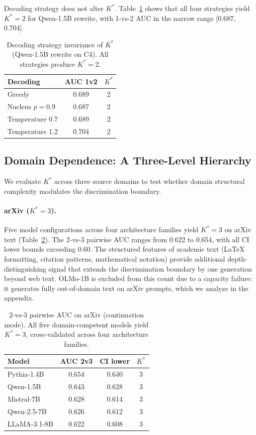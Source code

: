 \documentclass[11pt,a4paper]{article}
\newcommand{\Kstar}{K^{*}}
\begin{document}
Decoding strategy does not alter $\Kstar$. Table~\ref{tab:decoding} shows that all four strategies yield $\Kstar = 2$ for Qwen-1.5B rewrite, with 1-vs-2 AUC in the narrow range [0.687, 0.704].

\begin{table}[t]
\centering
\small
\begin{tabular}{lcc}
\toprule
\textbf{Decoding} & \textbf{AUC 1v2} & $\Kstar$ \\
\midrule
Greedy & 0.689 & 2 \\
Nucleus $p{=}0.9$ & 0.687 & 2 \\
Temperature 0.7 & 0.689 & 2 \\
Temperature 1.2 & 0.704 & 2 \\
\bottomrule
\end{tabular}
\caption{Decoding strategy invariance of $\Kstar$ (Qwen-1.5B rewrite on C4). All strategies produce $\Kstar = 2$.}
\label{tab:decoding}
\end{table}

\subsection{Domain Dependence: A Three-Level Hierarchy}
\label{sec:domain}

We evaluate $\Kstar$ across three source domains to test whether domain structural complexity modulates the discrimination boundary.

\paragraph{arXiv ($\Kstar = 3$).} Five model configurations across four architecture families yield $\Kstar = 3$ on arXiv text (Table~\ref{tab:arxiv}). The 2-vs-3 pairwise AUC ranges from 0.622 to 0.654, with all CI lower bounds exceeding 0.60. The structured features of academic text (LaTeX formatting, citation patterns, mathematical notation) provide additional depth-distinguishing signal that extends the discrimination boundary by one generation beyond web text. OLMo-1B is excluded from this count due to a capacity failure: it generates fully out-of-domain text on arXiv prompts, which we analyze in the appendix.

\begin{table}[t]
\centering
\small
\begin{tabular}{lccc}
\toprule
\textbf{Model} & \textbf{AUC 2v3} & \textbf{CI lower} & $\Kstar$ \\
\midrule
Pythia-1.4B & 0.654 & 0.640 & 3 \\
Qwen-1.5B & 0.643 & 0.628 & 3 \\
Mistral-7B & 0.628 & 0.614 & 3 \\
Qwen-2.5-7B & 0.626 & 0.612 & 3 \\
LLaMA-3.1-8B & 0.622 & 0.608 & 3 \\
\bottomrule
\end{tabular}
\caption{2-vs-3 pairwise AUC on arXiv (continuation mode). All five domain-competent models yield $\Kstar = 3$, cross-validated across four architecture families.}
\label{tab:arxiv}
\end{table}
\end{document}
